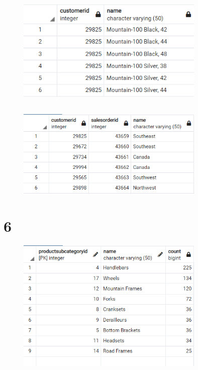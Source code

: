 \documentclass{article}
\begin{document}
\subsection{}
\begin{figure}[H]
    \centering
    \includegraphics[width=0.8\textwidth]{figures/5-c.png}
    \caption
	{
	}
    \label{fig:fig1}
\end{figure}

\subsection{}
\begin{figure}[H]
    \centering
    \includegraphics[width=0.8\textwidth]{figures/5-d.png}
    \caption
	{
	}
    \label{fig:fig1}
\end{figure}

\section{6}
\begin{figure}[H]
    \centering
    \includegraphics[width=0.8\textwidth]{figures/6.png}
    \caption
	{
	}
    \label{fig:fig1}
\end{figure}
\end{document}
